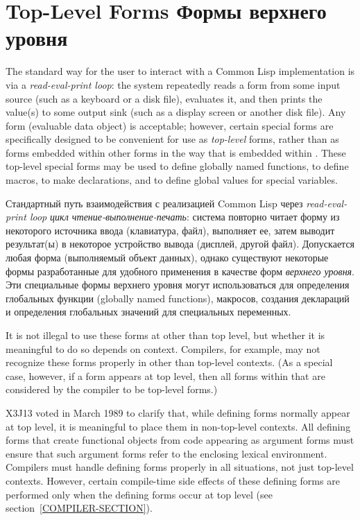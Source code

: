 \section{Top-Level Forms Формы верхнего уровня}

The standard way for the user to interact with a Common Lisp implementation is
via a \textit{read-eval-print loop}: the system repeatedly
reads a form from some input source (such as a keyboard or a disk file),
evaluates it, and then prints the value(s) to some output sink (such as a
display screen or another disk file).  Any form (evaluable
data object) is acceptable; however, certain special forms are specifically
designed to be convenient for use as \textit{top-level} forms,
rather than as forms embedded within other forms in the way
that 
is embedded within .
These top-level special forms may be used to define globally named
functions, to define macros, to make declarations,
and to define global values for special variables.

Стандартный путь взаимодействия с реализацией Common Lisp через
\textit{read-eval-print loop} \textit{цикл чтение-выполнение-печать}: система
повторно читает форму из некоторого источника ввода (клавиатура, файл),
выполняет ее, затем выводит результат(ы) в некоторое устройство вывода (дисплей,
другой файл). Допускается любая форма (выполняемый объект данных), однако
существуют некоторые формы разработанные для удобного применения в качестве форм 
\textit{верхнего уровня}.
Эти специальные формы верхнего уровня могут использоваться для определения
глобальных функции (globally named functions), макросов, создания деклараций и
определения глобальных значений для специальных переменных.

\begin{obsolete}
It is not illegal to use these forms at other than top level,
but whether it is meaningful to do so depends on context.
Compilers, for example, may not recognize these forms properly
in other than top-level contexts.  (As a special case, however,
if a  form appears at top level, then all forms
within that  are considered by the compiler to be top-level
forms.)
\end{obsolete}

\newpage%

\begin{newer}
X3J13 voted in March 1989 
to clarify that, while defining forms normally appear at top level,
it is meaningful to place them in non-top-level contexts.
All defining forms that create functional objects from code appearing
as argument forms must ensure that
such argument forms refer to the enclosing lexical environment.
Compilers must handle defining forms properly in all situations,
not just top-level contexts.  However, certain
compile-time side effects of these defining forms are performed only
when the defining forms occur at top level (see section~\ref{COMPILER-SECTION}).
\end{newer}


